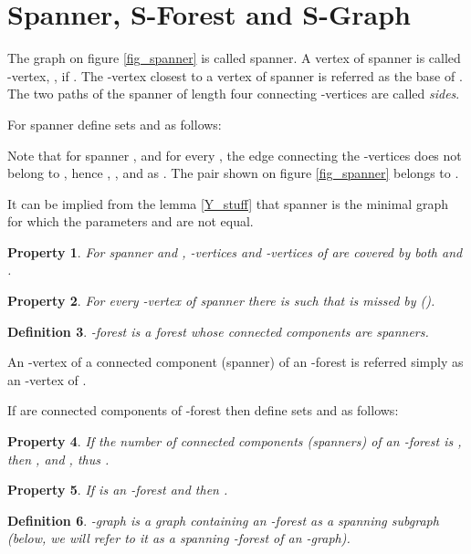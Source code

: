\documentclass[a4paper, 12pt]{article}
\newtheorem{definition}{Definition}[section]
\newtheorem{property}[definition]{Property}
\begin{document}
\section{Spanner, S-Forest and S-Graph}

The graph on figure \ref{fig_spanner} is called spanner. A vertex
 of spanner  is called -vertex, , if
. The -vertex closest to a vertex  of spanner is
referred as the base of . The two paths of the spanner of length
four connecting -vertices are called {\em sides}.

For spanner  define sets  and  as follows:




Note that for spanner , and for every , the
edge connecting the -vertices does not belong to ,
hence , , and
 as . The pair  shown on figure \ref{fig_spanner} belongs to
.

It can be implied from the lemma \ref{Y_stuff} that spanner is the
minimal graph for which the parameters  and  are not
equal.

\begin{property} \label{coveredbyboth}
For spanner  and , -vertices and
-vertices of  are covered by both  and .
\end{property}

\begin{property} \label{missedbyone}
For every -vertex  of spanner  there is 
such that  is missed by  ().
\end{property}

\begin{definition}\label{SForest}
-forest is a forest whose connected components are spanners.
\end{definition}

An -vertex of a connected component (spanner) of an -forest
 is referred simply as an -vertex of .

If  are connected components of -forest  then
define sets  and  as follows:



\begin{property} \label{S-forest_lambda=2alpha=8k}
If the number of connected components (spanners) of an -forest
 is , then , and , thus .
\end{property}

\begin{property} \label{S-forest_HH'_is_LU}
If  is an -forest and  then .
\end{property}

\begin{definition}\label{SGraph}
-graph is a graph containing an -forest as a spanning
subgraph (below, we will refer to it as a spanning -forest of an
-graph).
\end{definition}
\end{document}
